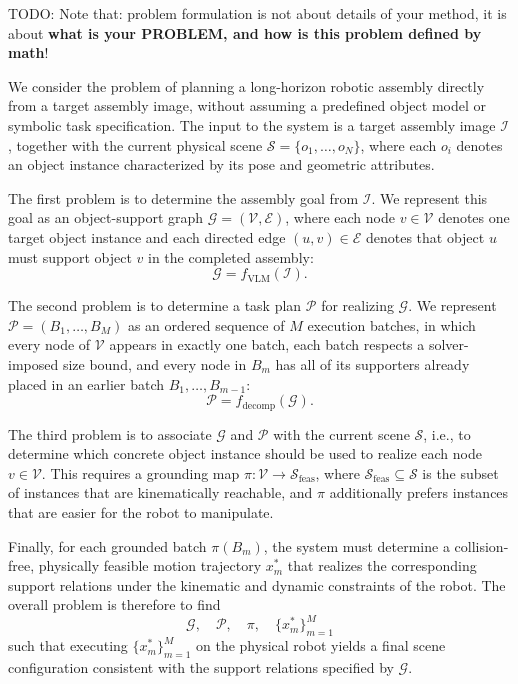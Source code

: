 \documentclass[journal]{IEEEtran}
\newcommand{\todo}[1]{{\color{red}TODO: #1}}
\begin{document}
\todo{Note that: problem formulation is not about details of your method, it is about \textbf{what is your PROBLEM, and how is this problem defined by math}!}

We consider the problem of planning a long-horizon robotic assembly directly
from a target assembly image, without assuming a predefined object model or
symbolic task specification. The input to the system is a target assembly
image $\mathcal{I}$, together with the current physical scene
$\mathcal{S}=\{o_1,\dots,o_N\}$, where each $o_i$ denotes an object instance
characterized by its pose and geometric attributes.

The first problem is to determine the assembly goal from $\mathcal{I}$. We
represent this goal as an object-support graph $\mathcal{G}=(\mathcal{V},\mathcal{E})$,
where each node $v\in\mathcal{V}$ denotes one target object instance and each
directed edge $(u,v)\in\mathcal{E}$ denotes that object $u$ must support
object $v$ in the completed assembly:
\begin{equation}
  \mathcal{G} = f_{\mathrm{VLM}}(\mathcal{I}).
  \label{eq:problem_goal}
\end{equation}

The second problem is to determine a task plan $\mathcal{P}$ for realizing
$\mathcal{G}$. We represent $\mathcal{P}=(B_1,\dots,B_M)$ as an ordered
sequence of $M$ execution batches, in which every node of $\mathcal{V}$
appears in exactly one batch, each batch respects a solver-imposed size
bound, and every node in $B_m$ has all of its supporters already placed in an
earlier batch $B_1,\dots,B_{m-1}$:
\begin{equation}
  \mathcal{P} = f_{\mathrm{decomp}}(\mathcal{G}).
  \label{eq:problem_plan}
\end{equation}

The third problem is to associate $\mathcal{G}$ and $\mathcal{P}$ with the
current scene $\mathcal{S}$, i.e., to determine which concrete object
instance should be used to realize each node $v\in\mathcal{V}$. This requires
a grounding map $\pi:\mathcal{V}\to\mathcal{S}_{\mathrm{feas}}$, where
$\mathcal{S}_{\mathrm{feas}}\subseteq\mathcal{S}$ is the subset of instances
that are kinematically reachable, and $\pi$ additionally prefers instances
that are easier for the robot to manipulate.

Finally, for each grounded batch $\pi(B_m)$, the system must determine a
collision-free, physically feasible motion trajectory $x_m^\ast$ that
realizes the corresponding support relations under the kinematic and dynamic
constraints of the robot. The overall problem is therefore to find
\begin{equation}
  \mathcal{G},\quad \mathcal{P},\quad \pi,\quad \{x_m^\ast\}_{m=1}^{M}
  \label{eq:problem_all}
\end{equation}
such that executing $\{x_m^\ast\}_{m=1}^{M}$ on the physical robot yields a
final scene configuration consistent with the support relations specified by
$\mathcal{G}$.
\end{document}
